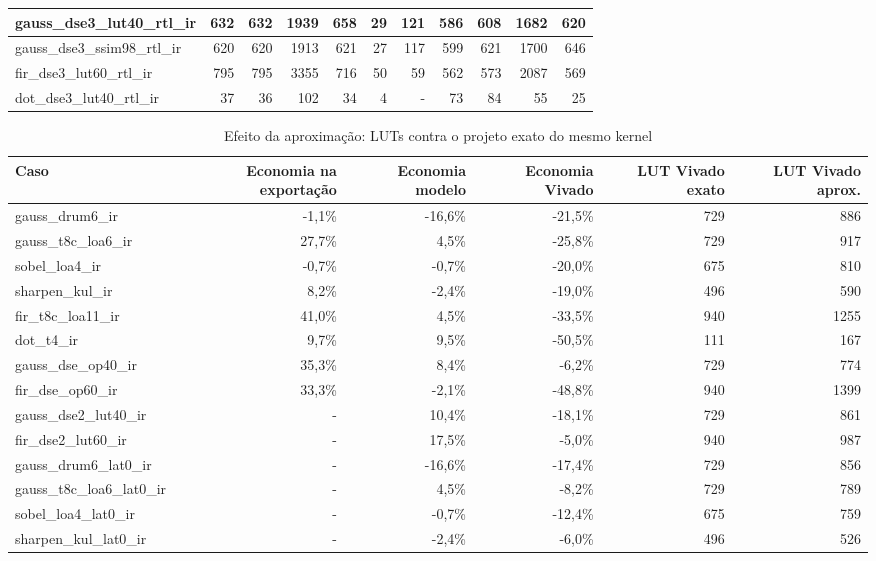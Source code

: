 \begin{table}[htbp]
\begin{tabular}{|l|r|r|r|r|r|r|r|r|r|r|}
gauss\_dse3\_lut40\_rtl\_ir & 632 & 632 & 1939 & 658 & 29 & 121 & 586 & 608 & 1682 & 620 \\ \hline
gauss\_dse3\_ssim98\_rtl\_ir & 620 & 620 & 1913 & 621 & 27 & 117 & 599 & 621 & 1700 & 646 \\ \hline
fir\_dse3\_lut60\_rtl\_ir & 795 & 795 & 3355 & 716 & 50 & 59 & 562 & 573 & 2087 & 569 \\ \hline
dot\_dse3\_lut40\_rtl\_ir & 37 & 36 & 102 & 34 & 4 & - & 73 & 84 & 55 & 25 \\ \hline
\end{tabular}
\end{table}

\begin{table}[htbp]
\centering
\caption{Efeito da aproximação: LUTs contra o projeto exato do mesmo kernel}
\begin{tabular}{|l|r|r|r|r|r|}
\hline
\rowcolor{tabAzul}\color{white}Caso & \color{white}Economia na exportação & \color{white}Economia modelo & \color{white}Economia Vivado & \color{white}LUT Vivado exato & \color{white}LUT Vivado aprox. \\
\hline
gauss\_drum6\_ir & -1,1\% & -16,6\% & -21,5\% & 729 & 886 \\ \hline
gauss\_t8c\_loa6\_ir & 27,7\% & 4,5\% & -25,8\% & 729 & 917 \\ \hline
sobel\_loa4\_ir & -0,7\% & -0,7\% & -20,0\% & 675 & 810 \\ \hline
sharpen\_kul\_ir & 8,2\% & -2,4\% & -19,0\% & 496 & 590 \\ \hline
fir\_t8c\_loa11\_ir & 41,0\% & 4,5\% & -33,5\% & 940 & 1255 \\ \hline
dot\_t4\_ir & 9,7\% & 9,5\% & -50,5\% & 111 & 167 \\ \hline
gauss\_dse\_op40\_ir & 35,3\% & 8,4\% & -6,2\% & 729 & 774 \\ \hline
fir\_dse\_op60\_ir & 33,3\% & -2,1\% & -48,8\% & 940 & 1399 \\ \hline
gauss\_dse2\_lut40\_ir & - & 10,4\% & -18,1\% & 729 & 861 \\ \hline
fir\_dse2\_lut60\_ir & - & 17,5\% & -5,0\% & 940 & 987 \\ \hline
gauss\_drum6\_lat0\_ir & - & -16,6\% & -17,4\% & 729 & 856 \\ \hline
gauss\_t8c\_loa6\_lat0\_ir & - & 4,5\% & -8,2\% & 729 & 789 \\ \hline
sobel\_loa4\_lat0\_ir & - & -0,7\% & -12,4\% & 675 & 759 \\ \hline
sharpen\_kul\_lat0\_ir & - & -2,4\% & -6,0\% & 496 & 526 \\ \hline

\end{tabular}
\end{table}
